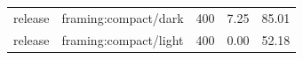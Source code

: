 \begin{longtable}{l>{\raggedright\arraybackslash}p{.42\linewidth}rrr}
release & %
framing:compact/dark & %
400 & %
7.25 & %
85.01 \\ %

release & %
framing:compact/light & %
400 & %
0.00 & %
52.18 \\ %


\end{longtable}
